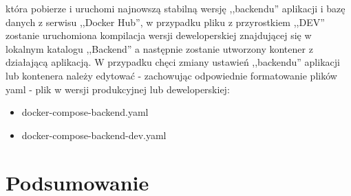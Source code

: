 \documentclass[12pt,a4paper]{article}
\begin{document}
		która pobierze i uruchomi najnowszą stabilną wersję ,,backendu'' aplikacji i bazę danych z serwisu ,,Docker Hub'', w przypadku pliku z przyrostkiem ,,DEV''
		zostanie uruchomiona kompilacja wersji deweloperskiej znajdującej się w lokalnym katalogu ,,Backend'' a następnie zostanie utworzony kontener z działającą aplikacją.
		W przypadku chęci zmiany ustawień ,,backendu'' aplikacji lub kontenera należy edytować - zachowując odpowiednie formatowanie plików yaml - plik w wersji produkcyjnej
		lub deweloperskiej:
		\begin{itemize}
			\item docker-compose-backend.yaml
			\item docker-compose-backend-dev.yaml		
		\end{itemize}
	\newpage	
	
	\section{Podsumowanie}		
\end{document}
